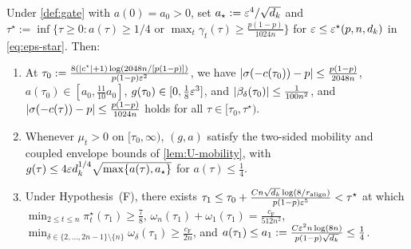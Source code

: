 \begin{lemma}
\label{lem:U-preroute}
Under \cref{def:gate} with $a(0) = a_0 > 0$, set $a_\star := \varepsilon^4/\sqrt{d_k}$ and $\tau^\star := \inf\{\tau \ge 0 : a(\tau) \ge 1/4 \text{ or } \max_t\gamma_t(\tau) \ge \frac{p(1-p)}{1024n}\}$ for $\varepsilon \le \varepsilon^\star(p,n,d_k)$ in \cref{eq:eps-star}. Then:
\begin{enumerate}[label=(\roman*),leftmargin=*]
\item At $\tau_0 := \frac{8(|c^\star|+1)\log(2048n/[p(1-p)])}{p(1-p)\varepsilon^2}$, we have $|\sigma(-c(\tau_0)) - p| \le \frac{p(1-p)}{2048n}$, $a(\tau_0) \in [a_0, \frac{11}{10}a_0]$, $g(\tau_0) \in [0, \frac{1}{8}\varepsilon^3]$, and $|\beta_\delta(\tau_0)| \le \frac{1}{100n^2}$, and $|\sigma(-c(\tau)) - p| \le \frac{p(1-p)}{1024n}$ holds for all $\tau \in [\tau_0, \tau^\star)$.
\item Whenever $\mu_t > 0$ on $[\tau_0, \infty)$, $(g, a)$ satisfy the two-sided mobility and coupled envelope bounds of \cref{lem:U-mobility}, with $g(\tau) \le 4\varepsilon d_k^{1/4}\sqrt{\max\{a(\tau), a_\star\}}$ for $a(\tau) \le \frac{1}{4}$.
\item Under Hypothesis~(F), there exists $\tau_1 \le \tau_0 + \frac{C n\sqrt{d_k}\log(8/r_{\mathrm{align}})}{p(1-p)\varepsilon^5} < \tau^\star$ at which $\min_{2\le t\le n}\pi_t^\star(\tau_1) \ge \frac{7}{8}$, $\omega_n(\tau_1) + \omega_1(\tau_1) = \frac{c_{\mathrm F}}{512n^2}$, $\min_{\delta\in\{2,\ldots,2n-1\}\setminus\{n\}} \omega_\delta(\tau_1) \ge \frac{c_{\mathrm F}}{2n}$, and $a(\tau_1) \le a_1 := \frac{C\varepsilon^2 n\log(8n)}{p(1-p)\sqrt{d_k}} \le \frac{1}{4}$.
\end{enumerate}
\end{lemma}
